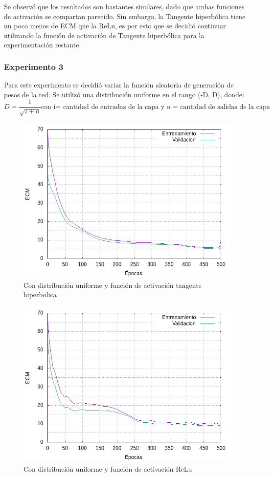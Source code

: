 Se observó que los resultados son bastantes similares, dado que ambas funciones de activación se compartan parecido. Sin embargo, la Tangente hiperbólica tiene un poco menos
de ECM que la ReLu, es por esto que se decidió continuar utilizando la función de activación de Tangente hiperbólica para la experimentación restante.

\subsubsection{Experimento 3}
Para este experimento se decidió variar la función aleatoria de generación de pesos de la red. Se utilizó una distribución uniforme en el rango (-D, D), donde:
\begin{equation}
  D = \frac{1}{\sqrt{i + o}} \mbox{con i= cantidad de entradas de la capa y o = cantidad de salidas de la capa}
\end{equation}

\begin{figure}[H]
  \includegraphics[width=125mm]{imagenes/ej2/ex_3-1_red-9-17-2_errors.png}
  \caption{Con distribución uniforme y función de activación tangente hiperbolica}
\end{figure}

\begin{figure}[H]
  \includegraphics[width=125mm]{imagenes/ej2/ex_3-2_red-9-17-2_errors.png}
  \caption{Con distribución uniforme y función de activación ReLu}
\end{figure}
